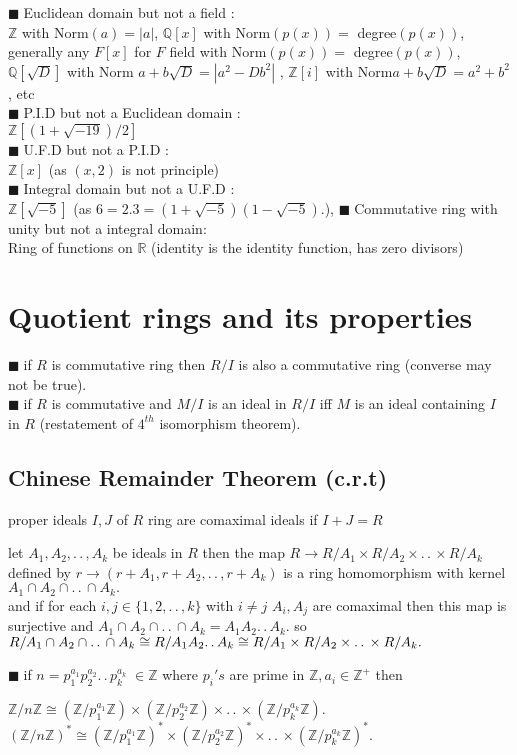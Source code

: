 \documentclass[11pt]{extarticle}
\newcommand{\ra}{\rightarrow}
\newcommand{\R}{\mathbb{R}}
\newcommand{\Z}{\mathbb{Z}}
\newcommand{\Q}{\mathbb{Q}}
\newcommand{\ck}{.\,.\,}
\newcommand{\tm}{\times}
\newcommand{\snote}[1]{{\footnotesize(#1)}}
\newcommand{\tbx}[2][]{
	\begin{tcolorbox}[enhanced,breakable,size=small,colback=black!2!white,title={#1},arc is angular, arc=1.5mm,drop fuzzy shadow]
		#2
	\end{tcolorbox}
}
\newcommand{\y}{$\blacksquare\;$}
\begin{document}
\begin{multicols}{2}
\tbx[Some examples]{
	\y Euclidean domain but not a field :\\
	$ \Z $ with Norm$ (a)=|a| $, $ \Q[x] $ with Norm$ (p(x)) =$ degree$ (p(x)) $, generally any $ F[x] $ for $ F $ field  with Norm$ (p(x)) =$ degree$ (p(x)) $, $ \Q[\sqrt{D}] $ with Norm $ a+b\sqrt{D} =|a^2-Db^2|$ , $ \Z[i] $  with Norm$ a+b\sqrt{D} =a^2+b^2$, etc\\
	\y P.I.D but not a Euclidean domain :\\
	$ \Z[(1+\sqrt{-19})/2] $  \\
	\y U.F.D but not a P.I.D : \\
	$ \Z[x] $ \snote{as $ (x,2) $ is not principle}\\
	\y Integral domain but not a U.F.D :\\
	$ \Z[\sqrt{-5}] $ \snote{as $ 6=2.3=(1+\sqrt{-5})(1-\sqrt{-5}) $.},
	\y Commutative ring with unity but not a integral domain:\\
	Ring of functions on $ \R $ \snote{identity is the identity function, has zero divisors}
}

\newcolumn
\section{Quotient rings and its properties}
\tbx{ \y if $ R $ is commutative ring then $ R/I $ is also a commutative ring (converse may not be true).\\
\y if $ R $ is commutative and $ M/I $ is an ideal in $ R/I $ iff $ M $ is an ideal containing $ I $ in $ R $ \snote{restatement of $ 4^{th} $ isomorphism theorem}.	 }


	\subsection{Chinese Remainder Theorem (c.r.t)}

\tbx{proper ideals $ I,J $ of $ R $ ring are comaximal ideals if $ I+J=R $
} 
\tbx[c.r.t]{ let $ A_1,A_2,\ck , A_k $ be ideals in $ R $ then the map 
	$ R \ra R/A_1 \tm R/A_2 \tm \ck \tm R/A_k $ defined by $ r \ra (r+A_1,r+A_2,\ck , r+A_k) $ is a 
	ring homomorphism with kernel $ A_1\cap A_2 \cap \ck \cap A_k. $\\
	and if for each $ i,j \in \{1,2,\ck , k\} $ with $ i\neq j $ $ A_i,A_j $ are comaximal then this 
	map is surjective and  $ A_1\cap A_2 \cap \ck \cap A_k=A_1A_2\ck A_k. $ so 
  $ R/ A_1\cap A_2 \cap \ck \cap A_k\cong\\
   R/A_1A_2\ck A_k\cong R/A_1 \tm R/A_2 \tm \ck \tm R/A_k.$  } 
\tbx[Consequences of c.r.t]{
	\y if $ n=p_1^{a_1}p_2^{a_2}\ck p_k^{a_k} \; \in \Z $ where $ p_i's$ are prime in $ \Z, a_i\in  
	\Z^+ $ then 
	\begin{center}
		$ \Z/n\Z \cong (\Z/p_1^{a_1}\Z)\tm (\Z/p_2^{a_2}\Z)\tm \ck \tm (\Z/p_k^{a_k}\Z). $
		$ (\Z/n\Z)^* \cong (\Z/p_1^{a_1}\Z)^*\tm (\Z/p_2^{a_2}\Z)^*\tm \ck \tm (\Z/p_k^{a_k}\Z)^*. $
	\end{center}
	
}
\end{multicols}
\end{document}
